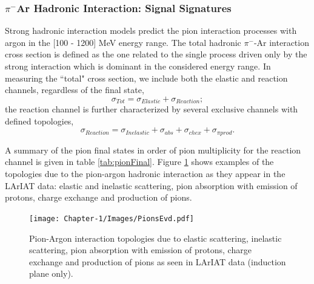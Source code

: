 \subsubsection{$\pi^{-}$Ar Hadronic Interaction: Signal Signatures}\label{ch:signature}
Strong hadronic interaction models \cite{9780198520085,9780471779957} predict the pion interaction processes with argon in the [100 - 1200] MeV energy range. 
The total hadronic $\pi^{-}$-Ar interaction cross section is defined as the one related to the single process driven only by the strong interaction which is dominant in the considered energy range. 
In measuring the ``total" cross section, we include both the elastic and  reaction channels, regardless of the final state, 
\begin{equation}
\sigma_{Tot} = \sigma_{Elastic}+ \sigma_{Reaction};
\end{equation}
the reaction channel is further characterized by several exclusive channels with defined topologies,
\begin{equation}
\sigma_{Reaction} = \sigma_{Inelastic} + \sigma_{abs} + \sigma_{chex}+ \sigma_{\pi prod}.
\end{equation}

A summary of the pion final states in order of pion multiplicity for the reaction channel is given in table \ref{tab:pionFinal}. Figure \ref{fig:PionsEvd} shows examples of the topologies due to the pion-argon hadronic interaction as they appear in the  LArIAT data: elastic and inelastic scattering, pion absorption with emission of protons, charge exchange and production of pions.



\begin{figure}[hbpt]
\centering
\texttt{[image: Chapter-1/Images/PionsEvd.pdf]}
\caption{Pion-Argon interaction topologies due to elastic scattering, inelastic scattering, pion absorption with emission of protons, charge exchange and production of pions as seen in LArIAT data (induction plane only).}
\label{fig:PionsEvd}
\end{figure}





